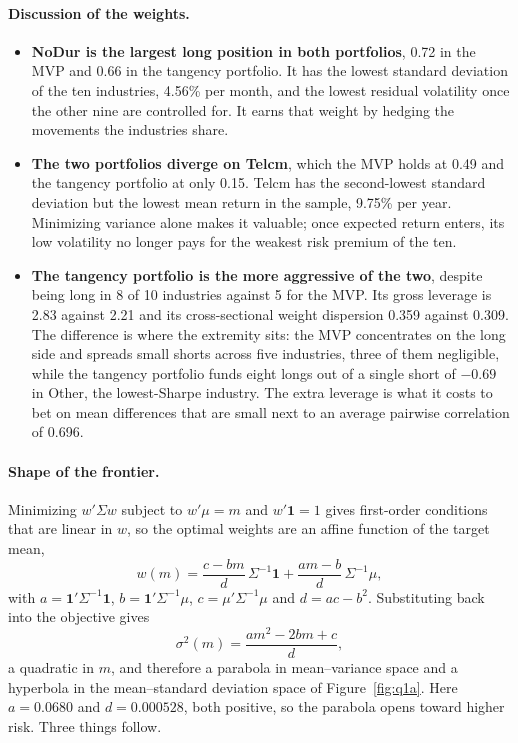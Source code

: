 \documentclass[11pt]{article}
\begin{document}
\paragraph{Discussion of the weights.}
\begin{itemize}
\setlength{\itemsep}{6pt}\setlength{\parskip}{0pt}

\item \textbf{NoDur is the largest long position in both portfolios}, 0.72 in
the MVP and 0.66 in the tangency portfolio. It has the lowest standard
deviation of the ten industries, 4.56\% per month, and the lowest residual
volatility once the other nine are controlled for. It earns that weight by
hedging the movements the industries share.

\item \textbf{The two portfolios diverge on Telcm}, which the MVP holds at
0.49 and the tangency portfolio at only 0.15. Telcm has the second-lowest
standard deviation but the lowest mean return in the sample, 9.75\% per year.
Minimizing variance alone makes it valuable; once expected return enters, its
low volatility no longer pays for the weakest risk premium of the ten.

\item \textbf{The tangency portfolio is the more aggressive of the two},
despite being long in 8 of 10 industries against 5 for the MVP. Its gross
leverage is 2.83 against 2.21 and its cross-sectional weight dispersion 0.359
against 0.309. The difference is where the extremity sits: the MVP
concentrates on the long side and spreads small shorts across five industries,
three of them negligible, while the tangency portfolio funds eight longs out
of a single short of $-0.69$ in Other, the lowest-Sharpe industry. The extra
leverage is what it costs to bet on mean differences that are small next to an
average pairwise correlation of 0.696.

\end{itemize}

\paragraph{Shape of the frontier.} Minimizing $w'\Sigma w$ subject to
$w'\mu = m$ and $w'\mathbf{1} = 1$ gives first-order conditions that are
linear in $w$, so the optimal weights are an affine function of the target
mean,
\begin{equation}
w(m) = \frac{c - bm}{d}\,\Sigma^{-1}\mathbf{1}
     + \frac{am - b}{d}\,\Sigma^{-1}\mu ,
\end{equation}
with $a = \mathbf{1}'\Sigma^{-1}\mathbf{1}$, $b = \mathbf{1}'\Sigma^{-1}\mu$,
$c = \mu'\Sigma^{-1}\mu$ and $d = ac - b^2$. Substituting back into the
objective gives
\begin{equation}
\sigma^2(m) = \frac{a m^2 - 2bm + c}{d},
\label{eq:frontier}
\end{equation}
a quadratic in $m$, and therefore a parabola in mean--variance space and a
hyperbola in the mean--standard deviation space of Figure~\ref{fig:q1a}. Here
$a = 0.0680$ and $d = 0.000528$, both positive, so the parabola opens toward
higher risk. Three things follow.
\end{document}
